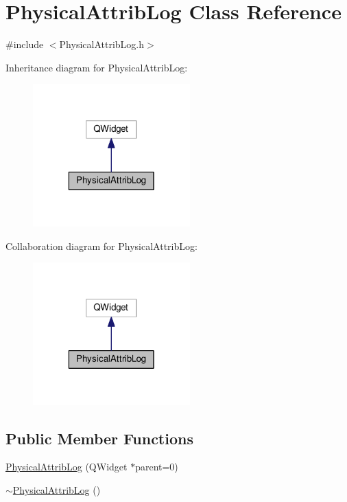 \hypertarget{class_physical_attrib_log}{\section{Physical\-Attrib\-Log Class Reference}
\label{class_physical_attrib_log}
}


{\ttfamily \#include $<$Physical\-Attrib\-Log.\-h$>$}



Inheritance diagram for Physical\-Attrib\-Log\-:\nopagebreak
\begin{figure}[H]
\begin{center}
\leavevmode
\includegraphics[width=172pt]{class_physical_attrib_log__inherit__graph}
\end{center}
\end{figure}


Collaboration diagram for Physical\-Attrib\-Log\-:\nopagebreak
\begin{figure}[H]
\begin{center}
\leavevmode
\includegraphics[width=172pt]{class_physical_attrib_log__coll__graph}
\end{center}
\end{figure}
\subsection*{Public Member Functions}
\begin{DoxyCompactItemize}
\item 
\hyperlink{class_physical_attrib_log_acc5e8a8e22a5beadbe74b1a02fa85263}{Physical\-Attrib\-Log} (Q\-Widget $\ast$parent=0)
\item 
\hyperlink{class_physical_attrib_log_a6cd3e9ff03598f1cfa13f7a78ca1a78b}{$\sim$\-Physical\-Attrib\-Log} ()
\end{DoxyCompactItemize}


